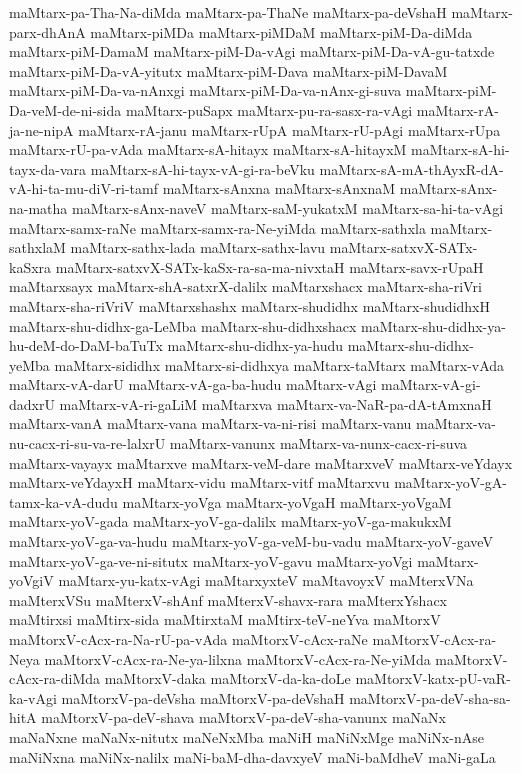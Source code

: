 {maMtarx-pa-Tha-Na-diMda
maMtarx-pa-ThaNe
maMtarx-pa-deVshaH
maMtarx-parx-dhAnA
maMtarx-piMDa
maMtarx-piMDaM
maMtarx-piM-Da-diMda
maMtarx-piM-DamaM
maMtarx-piM-Da-vAgi
maMtarx-piM-Da-vA-gu-tatxde
maMtarx-piM-Da-vA-yitutx
maMtarx-piM-Dava
maMtarx-piM-DavaM
maMtarx-piM-Da-va-nAnxgi
maMtarx-piM-Da-va-nAnx-gi-suva
maMtarx-piM-Da-veM-de-ni-sida
maMtarx-puSapx
maMtarx-pu-ra-sasx-ra-vAgi
maMtarx-rA-ja-ne-nipA
maMtarx-rA-janu
maMtarx-rUpA
maMtarx-rU-pAgi
maMtarx-rUpa
maMtarx-rU-pa-vAda
maMtarx-sA-hitayx
maMtarx-sA-hitayxM
maMtarx-sA-hi-tayx-da-vara
maMtarx-sA-hi-tayx-vA-gi-ra-beVku
maMtarx-sA-mA-thAyxR-dA-vA-hi-ta-mu-diV-ri-tamf
maMtarx-sAnxna
maMtarx-sAnxnaM
maMtarx-sAnx-na-matha
maMtarx-sAnx-naveV
maMtarx-saM-yukatxM
maMtarx-sa-hi-ta-vAgi
maMtarx-samx-raNe
maMtarx-samx-ra-Ne-yiMda
maMtarx-sathxla
maMtarx-sathxlaM
maMtarx-sathx-lada
maMtarx-sathx-lavu
maMtarx-satxvX-SATx-kaSxra
maMtarx-satxvX-SATx-kaSx-ra-sa-ma-nivxtaH
maMtarx-savx-rUpaH
maMtarxsayx
maMtarx-shA-satxrX-dalilx
maMtarxshacx
maMtarx-sha-riVri
maMtarx-sha-riVriV
maMtarxshashx
maMtarx-shudidhx
maMtarx-shudidhxH
maMtarx-shu-didhx-ga-LeMba
maMtarx-shu-didhxshacx
maMtarx-shu-didhx-ya-hu-deM-do-DaM-baTuTx
maMtarx-shu-didhx-ya-hudu
maMtarx-shu-didhx-yeMba
maMtarx-sididhx
maMtarx-si-didhxya
maMtarx-taMtarx
maMtarx-vAda
maMtarx-vA-darU
maMtarx-vA-ga-ba-hudu
maMtarx-vAgi
maMtarx-vA-gi-dadxrU
maMtarx-vA-ri-gaLiM
maMtarxva
maMtarx-va-NaR-pa-dA-tAmxnaH
maMtarx-vanA
maMtarx-vana
maMtarx-va-ni-risi
maMtarx-vanu
maMtarx-va-nu-cacx-ri-su-va-re-lalxrU
maMtarx-vanunx
maMtarx-va-nunx-cacx-ri-suva
maMtarx-vayayx
maMtarxve
maMtarx-veM-dare
maMtarxveV
maMtarx-veYdayx
maMtarx-veYdayxH
maMtarx-vidu
maMtarx-vitf
maMtarxvu
maMtarx-yoV-gA-tamx-ka-vA-dudu
maMtarx-yoVga
maMtarx-yoVgaH
maMtarx-yoVgaM
maMtarx-yoV-gada
maMtarx-yoV-ga-dalilx
maMtarx-yoV-ga-makukxM
maMtarx-yoV-ga-va-hudu
maMtarx-yoV-ga-veM-bu-vadu
maMtarx-yoV-gaveV
maMtarx-yoV-ga-ve-ni-situtx
maMtarx-yoV-gavu
maMtarx-yoVgi
maMtarx-yoVgiV
maMtarx-yu-katx-vAgi
maMtarxyxteV
maMtavoyxV
maMterxVNa
maMterxVSu
maMterxV-shAnf
maMterxV-shavx-rara
maMterxYshacx
maMtirxsi
maMtirx-sida
maMtirxtaM
maMtirx-teV-neYva
maMtorxV
maMtorxV-cAcx-ra-Na-rU-pa-vAda
maMtorxV-cAcx-raNe
maMtorxV-cAcx-ra-Neya
maMtorxV-cAcx-ra-Ne-ya-lilxna
maMtorxV-cAcx-ra-Ne-yiMda
maMtorxV-cAcx-ra-diMda
maMtorxV-daka
maMtorxV-da-ka-doLe
maMtorxV-katx-pU-vaR-ka-vAgi
maMtorxV-pa-deVsha
maMtorxV-pa-deVshaH
maMtorxV-pa-deV-sha-sa-hitA
maMtorxV-pa-deV-shava
maMtorxV-pa-deV-sha-vanunx
maNaNx
maNaNxne
maNaNx-nitutx
maNeNxMba
maNiH
maNiNxMge
maNiNx-nAse
maNiNxna
maNiNx-nalilx
maNi-baM-dha-davxyeV
maNi-baMdheV
maNi-gaLa
}
